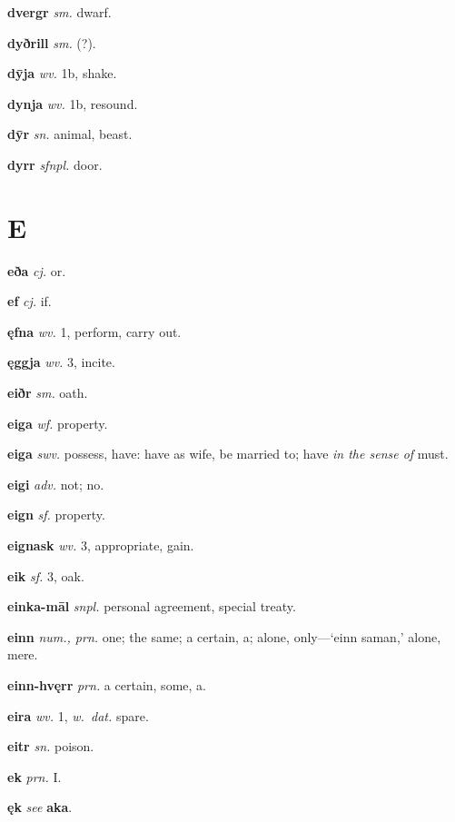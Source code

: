 \documentclass[12pt,letterpaper]{book}
\newcommand\emptypage{\clearpage{\pagestyle{empty}\cleardoublepage}}
\begin{document}
\noindent
\textbf{dvergr} \textit{sm.} dwarf.

\noindent
\textbf{dyðrill} \textit{sm.} (?).

\noindent
\textbf{dȳja} \textit{wv.} 1b, shake.

\noindent
\textbf{dynja} \textit{wv.} 1b, resound.

\noindent
\textbf{dȳr} \textit{sn.} animal, beast.

\noindent
\textbf{dyrr} \textit{sfnpl.} door.

\emptypage

\chapter*{E}

\noindent
\textbf{eða} \textit{cj.} or.

\noindent
\textbf{ef} \textit{cj.} if.

\noindent
\textbf{ęfna} \textit{wv.} 1, perform, carry out.

\noindent
\textbf{ęggja} \textit{wv.} 3, incite.

\noindent
\textbf{eiðr} \textit{sm.} oath.

\noindent
\textbf{eiga} \textit{wf.} property.

\noindent
\textbf{eiga} \textit{swv.} possess, have: have as wife, be married to;
	have \textit{in the sense of} must.

\noindent
\textbf{eigi} \textit{adv.} not; no.

\noindent
\textbf{eign} \textit{sf.} property.

\noindent
\textbf{eignask} \textit{wv.} 3, appropriate, gain.

\noindent
\textbf{eik} \textit{sf.} 3, oak.

\noindent
\textbf{einka-māl} \textit{snpl.} personal agreement, special treaty.

\noindent
\textbf{einn} \textit{num., prn.} one; the same; a certain, a; alone,
	only---`einn saman,' alone, mere.

\noindent
\textbf{einn-hvęrr} \textit{prn.} a certain, some, a.

\noindent
\textbf{eira} \textit{wv.} 1, \textit{w.\ dat.} spare.

\noindent
\textbf{eitr} \textit{sn.} poison.

\noindent
\textbf{ek} \textit{prn.} I.

\noindent
\textbf{ęk} \textit{} \textit{see} \textbf{aka}.
\end{document}
